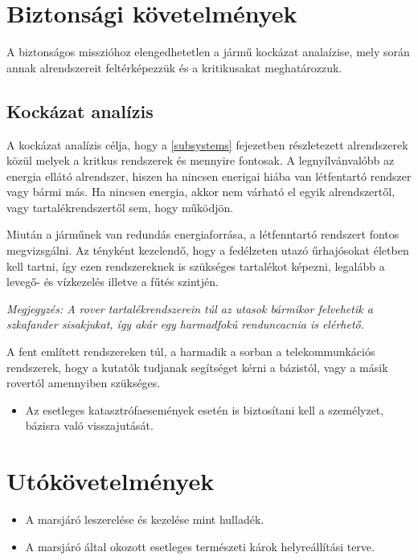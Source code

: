 \documentclass[12pt]{report}
\begin{document}
\section{Biztonsági követelmények}

A biztonságos misszióhoz elengedhetetlen a jármű kockázat analaízise, mely során annak alrendszereit feltérképezzük és a kritikusakat meghatározzuk. 

\subsection{Kockázat analízis}

A kockázat analízis célja, hogy a \ref{subsystems} fejezetben részletezett alrendszerek közül melyek a kritkus rendszerek és mennyire fontosak. A legnyílvánvalóbb az energia ellátó alrendszer, hiszen ha nincsen enerigai hiába van létfentartó rendszer vagy bármi más. Ha nincsen energia, akkor nem várható el egyik alrendszertől, vagy tartalékrendszertől sem, hogy működjön.

Miután a járműnek van redundás energiaforrása, a létfenntartó rendszert fontos megvizsgálni. Az tényként kezelendő, hogy a fedélzeten utazó űrhajósokat életben kell tartni, így ezen rendszereknek is szükséges tartalékot képezni, legalább a levegő- és vízkezelés illetve a fűtés szintjén. 

\textit{Megjegyzés: A rover tartalékrendszerein túl az utasok bármikor felvehetik a szkafander sisakjukat, így akár egy harmadfokú renduncacnia is elérhető.}

A fent említett rendszereken túl, a harmadik a sorban a telekommunkációs rendszerek, hogy a kutatók tudjanak segítséget kérni a bázistól, vagy a másik rovertól amennyiben szükséges.

\begin{itemize}
  \item Az esetleges katasztrófaesemények esetén is biztosítani kell a személyzet, bázisra való visszajutását.
\end{itemize}
\section{Utókövetelmények}
\begin{itemize}
  \item {} A marsjáró leszerelése és kezelése mint hulladék.
  \item {} A marsjáró által okozott esetleges természeti károk helyreállítási terve.
\end{itemize}
\end{document}
